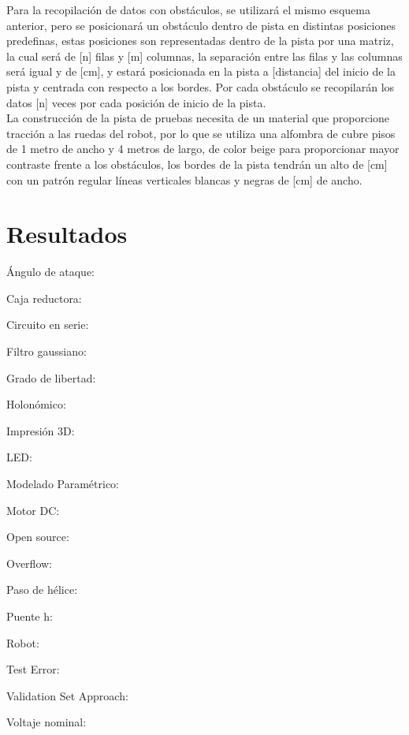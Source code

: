 \documentclass{iccmemoria}
\begin{document}
Para la recopilación de datos con obstáculos, se utilizará el mismo esquema anterior, pero se posicionará un obstáculo dentro de pista en distintas posiciones predefinas, estas posiciones son representadas dentro de la pista por una matriz, la cual será de [n] filas y [m] columnas, la separación entre las filas y las columnas será igual y de [cm], y estará posicionada en la pista a [distancia] del inicio de la pista y centrada con respecto a los bordes. Por cada obstáculo se recopilarán los datos [n] veces por cada posición de inicio de la pista.\\

La construcción de la pista de pruebas necesita de un material que proporcione tracción a las ruedas del robot, por lo que se utiliza una alfombra de cubre pisos de 1 metro de ancho y 4 metros de largo, de color beige para proporcionar mayor contraste frente a los obstáculos, los bordes de la pista tendrán un alto de [cm] con un patrón regular líneas verticales blancas y negras de [cm] de ancho.

\chapter{Resultados}




\begin{glosario}
	\item[Ángulo de ataque:]
	\item[Caja reductora:]
	\item[Circuito en serie:]
	\item[Filtro gaussiano:]
	\item[Grado de libertad:]
	\item[Holonómico:]
	\item[Impresión 3D:]
	\item[LED:]
	\item[Modelado Paramétrico:]
	\item[Motor DC:]
	\item[Open source:]
	\item[Overflow:]
	\item[Paso de hélice:]
	\item[Puente h:]
	\item[Robot:]
	\item[Test Error:]
	\item[Validation Set Approach:]
	\item[Voltaje nominal:]
\end{glosario}
\end{document}
